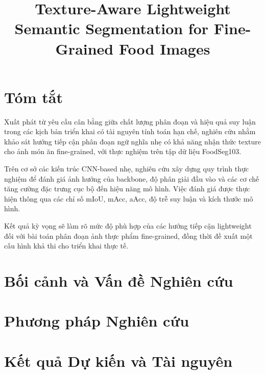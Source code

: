 \documentclass[conference]{IEEEtran}
\begin{document}
\title{Texture-Aware Lightweight Semantic Segmentation for Fine-Grained Food Images}

\author{
}

\maketitle

\section{Tóm tắt}

Xuất phát từ yêu cầu cân bằng giữa chất lượng phân đoạn và hiệu quả suy luận trong các kịch bản triển khai có tài nguyên tính toán hạn chế, nghiên cứu nhằm khảo sát hướng tiếp cận phân đoạn ngữ nghĩa nhẹ có khả năng nhận thức texture cho ảnh món ăn fine-grained, với thực nghiệm trên tập dữ liệu FoodSeg103.

Trên cơ sở các kiến trúc CNN-based nhẹ, nghiên cứu xây dựng quy trình thực nghiệm để đánh giá ảnh hưởng của backbone, độ phân giải đầu vào và các cơ chế tăng cường đặc trưng cục bộ đến hiệu năng mô hình. Việc đánh giá được thực hiện thông qua các chỉ số mIoU, mAcc, aAcc, độ trễ suy luận và kích thước mô hình.

Kết quả kỳ vọng sẽ làm rõ mức độ phù hợp của các hướng tiếp cận lightweight đối với bài toán phân đoạn ảnh thực phẩm fine-grained, đồng thời đề xuất một cấu hình khả thi cho triển khai thực tế.

\section{Bối cảnh và Vấn đề Nghiên cứu}


\section{Phương pháp Nghiên cứu}


\section{Kết quả Dự kiến và Tài nguyên}

\end{document}
